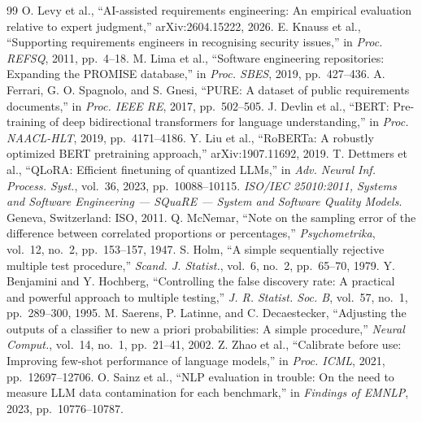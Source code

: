 \documentclass[conference]{IEEEtran}
\begin{document}
\begin{thebibliography}{99}
 O. Levy et al., ``AI-assisted requirements engineering: An
empirical evaluation relative to expert judgment,'' arXiv:2604.15222, 2026.
 E. Knauss et al., ``Supporting requirements engineers in
recognising security issues,'' in \emph{Proc. REFSQ}, 2011, pp.~4--18.
 M. Lima et al., ``Software engineering repositories: Expanding
the PROMISE database,'' in \emph{Proc. SBES}, 2019, pp.~427--436.
 A. Ferrari, G. O. Spagnolo, and S. Gnesi, ``PURE: A dataset
of public requirements documents,'' in \emph{Proc. IEEE RE}, 2017,
pp.~502--505.
 J. Devlin et al., ``BERT: Pre-training of deep bidirectional
transformers for language understanding,'' in \emph{Proc. NAACL-HLT}, 2019,
pp.~4171--4186.
 Y. Liu et al., ``RoBERTa: A robustly optimized BERT
pretraining approach,'' arXiv:1907.11692, 2019.
 T. Dettmers et al., ``QLoRA: Efficient finetuning of
quantized LLMs,'' in \emph{Adv. Neural Inf. Process. Syst.}, vol.~36, 2023,
pp.~10088--10115.
 \emph{ISO/IEC 25010:2011, Systems and Software Engineering
--- SQuaRE --- System and Software Quality Models}. Geneva, Switzerland: ISO,
2011.
 Q. McNemar, ``Note on the sampling error of the
difference between correlated proportions or percentages,''
\emph{Psychometrika}, vol.~12, no.~2, pp.~153--157, 1947.
 S. Holm, ``A simple sequentially rejective multiple test
procedure,'' \emph{Scand. J. Statist.}, vol.~6, no.~2, pp.~65--70, 1979.
 Y. Benjamini and Y. Hochberg, ``Controlling the false
discovery rate: A practical and powerful approach to multiple testing,''
\emph{J. R. Statist. Soc. B}, vol.~57, no.~1, pp.~289--300, 1995.
 M. Saerens, P. Latinne, and C. Decaestecker, ``Adjusting
the outputs of a classifier to new a priori probabilities: A simple
procedure,'' \emph{Neural Comput.}, vol.~14, no.~1, pp.~21--41, 2002.
 Z. Zhao et al., ``Calibrate before use: Improving few-shot
performance of language models,'' in \emph{Proc. ICML}, 2021, pp.~12697--12706.
 O. Sainz et al., ``NLP evaluation in trouble: On the need to
measure LLM data contamination for each benchmark,'' in \emph{Findings of
EMNLP}, 2023, pp.~10776--10787.
\end{thebibliography}
\end{document}
